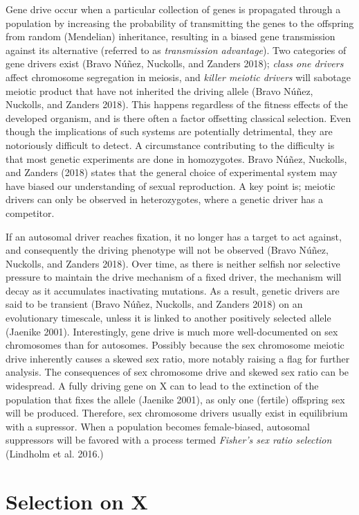 \documentclass[
  11pt,
  a4paper,
]{scrbook}
\let\oldemph\emph
\renewcommand\emph[1]{\oldemph{\color{gray}#1}}
\begin{document}
Gene drive occur when a particular collection of genes is propagated
through a population by increasing the probability of transmitting the
genes to the offspring from random (Mendelian) inheritance, resulting in
a biased gene transmission against its alternative (referred to as
\emph{transmission advantage}). Two categories of gene drivers exist
(Bravo Núñez, Nuckolls, and Zanders 2018); \emph{class one drivers}
affect chromosome segregation in meiosis, and \emph{killer meiotic
drivers} will sabotage meiotic product that have not inherited the
driving allele (Bravo Núñez, Nuckolls, and Zanders 2018). This happens
regardless of the fitness effects of the developed organism, and is
there often a factor offsetting classical selection. Even though the
implications of such systems are potentially detrimental, they are
notoriously difficult to detect. A circumstance contributing to the
difficulty is that most genetic experiments are done in homozygotes.
Bravo Núñez, Nuckolls, and Zanders (2018) states that the general choice
of experimental system may have biased our understanding of sexual
reproduction. A key point is; meiotic drivers can only be observed in
heterozygotes, where a genetic driver has a competitor.

If an autosomal driver reaches fixation, it no longer has a target to
act against, and consequently the driving phenotype will not be observed
(Bravo Núñez, Nuckolls, and Zanders 2018). Over time, as there is
neither selfish nor selective pressure to maintain the drive mechanism
of a fixed driver, the mechanism will decay as it accumulates
inactivating mutations. As a result, genetic drivers are said to be
transient (Bravo Núñez, Nuckolls, and Zanders 2018) on an evolutionary
timescale, unless it is linked to another positively selected allele
(Jaenike 2001). Interestingly, gene drive is much more well-documented
on sex chromosomes than for autosomes. Possibly because the sex
chromosome meiotic drive inherently causes a skewed sex ratio, more
notably raising a flag for further analysis. The consequences of sex
chromosome drive and skewed sex ratio can be widespread. A fully driving
gene on X can to lead to the extinction of the population that fixes the
allele (Jaenike 2001), as only one (fertile) offspring sex will be
produced. Therefore, sex chromosome drivers usually exist in equilibrium
with a supressor. When a population becomes female-biased, autosomal
suppressors will be favored with a process termed \emph{Fisher's sex
ratio selection} (Lindholm et al. 2016.)

\section{Selection on X}\label{selection-on-x}
\end{document}
